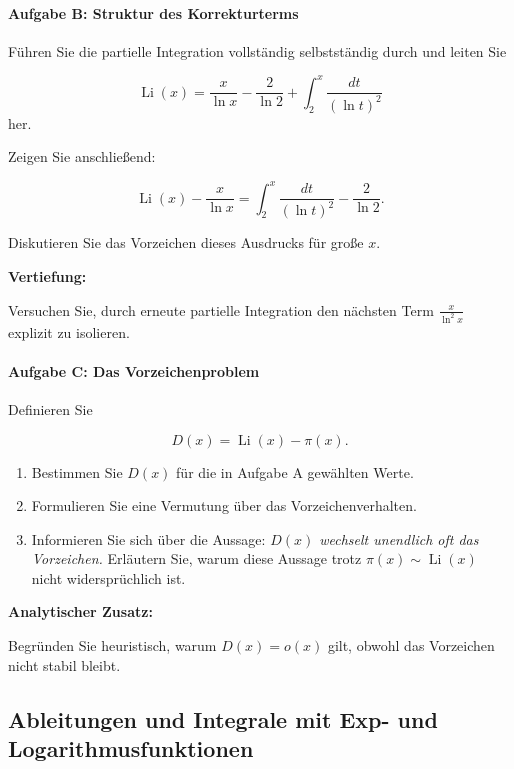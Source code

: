 \documentclass[../Mathe_Aufgaben.tex]{subfiles}
\begin{document}
\bigskip

\paragraph{Aufgabe B: Struktur des Korrekturterms}

Führen Sie die partielle Integration vollständig selbstständig durch
und leiten Sie

\[
\operatorname{Li}(x)
=
\frac{x}{\ln x}
-
\frac{2}{\ln 2}
+
\int_2^x\frac{dt}{(\ln t)^2}
\]
her.

Zeigen Sie anschließend:

\[
\operatorname{Li}(x) - \frac{x}{\ln x}
=
\int_2^x\frac{dt}{(\ln t)^2}
-
\frac{2}{\ln 2}.
\]

Diskutieren Sie das Vorzeichen dieses Ausdrucks
für große $x$.

\textbf{Vertiefung:}

Versuchen Sie, durch erneute partielle Integration
den nächsten Term $\frac{x}{\ln^2 x}$ explizit zu isolieren.

\bigskip

\paragraph{Aufgabe C: Das Vorzeichenproblem}

Definieren Sie

\[
D(x)=\operatorname{Li}(x)-\pi(x).
\]

\begin{enumerate}
\item Bestimmen Sie $D(x)$ für die in Aufgabe A gewählten Werte.
\item Formulieren Sie eine Vermutung über das Vorzeichenverhalten.
\item Informieren Sie sich über die Aussage:
\emph{$D(x)$ wechselt unendlich oft das Vorzeichen.}
Erläutern Sie, warum diese Aussage trotz
$\pi(x)\sim\operatorname{Li}(x)$
nicht widersprüchlich ist.
\end{enumerate}

\textbf{Analytischer Zusatz:}

Begründen Sie heuristisch,
warum $D(x)=o(x)$ gilt,
obwohl das Vorzeichen nicht stabil bleibt.


	\subsection{Ableitungen und Integrale mit Exp- und Logarithmusfunktionen}
	\label{subsec:aufg-ablint-explog}
\end{document}
